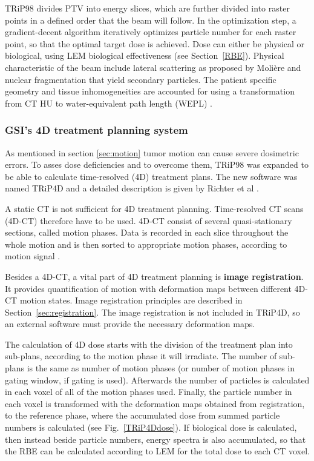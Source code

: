 \documentclass[type=dr, dr=rernat, accentcolor=tud7b,colorbacktitle, bigchapter, openright, twoside, 12pt ]{tudthesis}
\begin{document}
TRiP98 divides PTV into energy slices, which are further divided into raster points in a defined order that the beam will follow. In the optimization step, a gradient-decent algorithm iteratively optimizes particle number
for each raster point, so that the optimal target dose is achieved. Dose can either be physical or biological, using LEM biological effectiveness (see Section~\ref{RBE}).
Physical characteristic of the beam include lateral scattering as proposed by Moli\`ere \cite{Moliere1948} and nuclear fragmentation that yield secondary particles. The patient specific
geometry and tissue inhomogeneities are accounted for using a transformation from CT HU to water-equivalent path length (WEPL) \cite{Geiss1999,Jaekel2001,Rietzel2007}.


\subsubsection{GSI's 4D treatment planning system}

As mentioned in section \ref{sec:motion} tumor motion can cause severe dosimetric errors. To asses dose deficiencies and to overcome them, TRiP98 was expanded to be able to calculate time-resolved (4D) treatment plans. The new software was named TRiP4D and a detailed description is given by Richter et al \cite{Richter2013}.

A static CT is not sufficient for 4D treatment planning. Time-resolved CT scans (4D-CT) therefore have to be used. 4D-CT consist of several quasi-stationary sections, called motion phases. Data is
recorded in each slice throughout the whole motion and is then sorted to appropriate motion phases, according to motion signal \cite{Rietzel2005}.

Besides a 4D-CT, a vital part of 4D treatment planning is \textbf{image registration}. It provides quantification of motion with deformation maps between different 4D-CT motion states. Image registration principles are described in Section~\ref{sec:registration}. The image registration is not included in TRiP4D, so an external software must provide the necessary
deformation maps.

The calculation of 4D dose starts with the division of the treatment plan into sub-plans, according to the motion phase it will irradiate. The number of sub-plans is the same as number of motion phases (or number of motion phases
in gating window, if gating is used). Afterwards the number of particles is calculated in each voxel of all of the motion phases used. Finally, the particle number in each voxel is transformed with the deformation maps
obtained from registration, to the reference phase, where the accumulated dose from summed particle numbers is calculated (see Fig.~\ref{TRiP4Ddose}). If biological dose is calculated, then instead beside particle numbers, energy spectra is also accumulated, 
so that the RBE can be calculated according to LEM for the total dose to each CT voxel.
\end{document}
